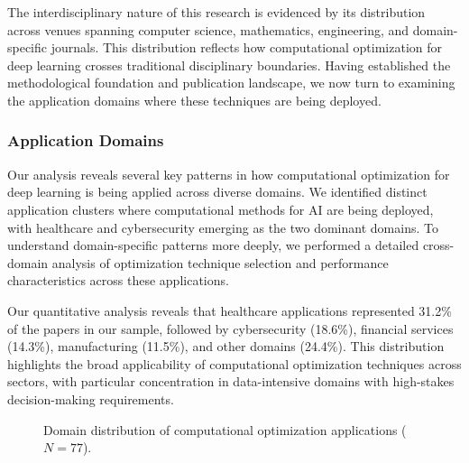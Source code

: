 \documentclass[acmsmall]{acmart}
\begin{document}
The interdisciplinary nature of this research is evidenced by its distribution across venues spanning computer science, mathematics, engineering, and domain-specific journals. This distribution reflects how computational optimization for deep learning crosses traditional disciplinary boundaries. Having established the methodological foundation and publication landscape, we now turn to examining the application domains where these techniques are being deployed.

\subsubsection{Application Domains}\label{subsubsec:overview-of-included-studies:application-domains}
Our analysis reveals several key patterns in how computational optimization for deep learning is being applied across diverse domains. We identified distinct application clusters where computational methods for AI are being deployed, with healthcare and cybersecurity emerging as the two dominant domains. To understand domain-specific patterns more deeply, we performed a detailed cross-domain analysis of optimization technique selection and performance characteristics across these applications.

Our quantitative analysis reveals that healthcare applications represented 31.2\% of the papers in our sample, followed by cybersecurity (18.6\%), financial services (14.3\%), manufacturing (11.5\%), and other domains (24.4\%). This distribution highlights the broad applicability of computational optimization techniques across sectors, with particular concentration in data-intensive domains with high-stakes decision-making requirements.

\begin{figure}[ht]
    \centering
    \caption{Domain distribution of computational optimization applications ($N=77$).}
    \label{fig:domain-distribution}
\end{figure}
\end{document}
